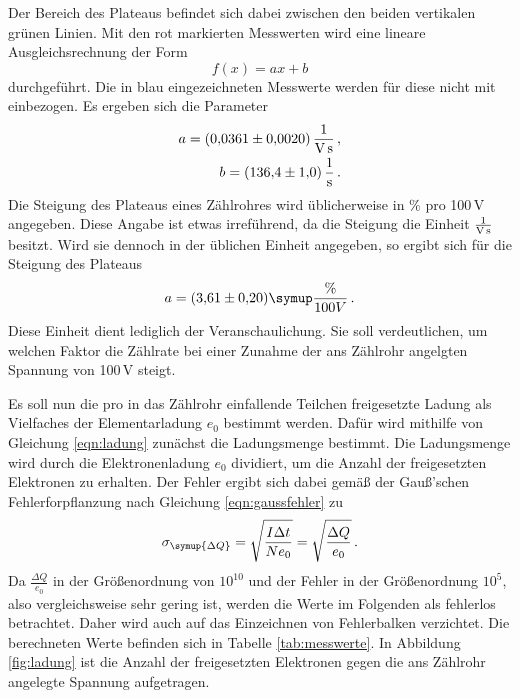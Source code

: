 Der Bereich des Plateaus befindet sich dabei zwischen den
beiden vertikalen grünen Linien. Mit den rot markierten Messwerten wird eine lineare
Ausgleichsrechnung der Form
\begin{equation}
  f(x)=ax+b
\end{equation}
durchgeführt. Die in blau eingezeichneten Messwerte werden für diese nicht mit
einbezogen. Es ergeben sich die Parameter
\begin{align*}
  a = (0{,}0361 \pm 0{,}0020)\, \frac{1}{\text{V\,s}} \,,\\
  b = (136{,}4 \pm 1{,}0)\,\frac{1}{\text{s}} \,.
\end{align*}
Die Steigung des Plateaus eines Zählrohres wird üblicherweise in $\%$ pro 100\,V
angegeben. Diese Angabe ist etwas irreführend, da die Steigung die Einheit
$\frac{1}{\text{V\,s}}$ besitzt. Wird sie dennoch in der üblichen Einheit angegeben,
so ergibt sich für die Steigung des Plateaus
\begin{equation*}
  a=(3{,}61 \pm 0{,}20) \symup{\frac{\%}{100V}} \,.  %
\end{equation*}
Diese Einheit dient lediglich der Veranschaulichung. Sie soll verdeutlichen, um welchen
Faktor die Zählrate bei einer Zunahme der ans Zählrohr angelgten Spannung von 100\,V
steigt. 





Es soll nun die pro in das Zählrohr einfallende Teilchen freigesetzte Ladung
als Vielfaches der Elementarladung $e_0$ bestimmt werden. Dafür wird mithilfe von
Gleichung \eqref{eqn:ladung} zunächst die Ladungsmenge bestimmt. Die Ladungsmenge wird durch die
Elektronenladung $e_0$ dividiert, um die Anzahl der freigesetzten Elektronen
zu erhalten. Der Fehler ergibt sich dabei
gemäß der Gauß'schen Fehlerforpflanzung nach Gleichung \eqref{eqn:gaussfehler} zu
\begin{equation*}
  \sigma_{\symup{\Delta Q}}=\sqrt{\frac{I \Delta t}{N e_0}}=\sqrt{\frac{\Delta Q}{e_0}} \,.
\end{equation*}
Da $\frac{\Delta Q}{e_0}$ in der Größenordnung von $10^{10}$ und der Fehler in der
Größenordnung $10^{5}$, also vergleichsweise sehr gering ist, werden die
Werte im Folgenden als fehlerlos betrachtet. Daher wird auch auf das Einzeichnen von
Fehlerbalken verzichtet. Die berechneten Werte
befinden sich in Tabelle \ref{tab:messwerte}.
In Abbildung \ref{fig:ladung} ist die Anzahl der freigesetzten Elektronen
gegen die ans Zählrohr angelegte Spannung aufgetragen.

